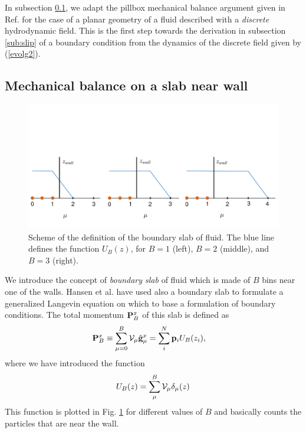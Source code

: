 \documentclass[b5paper,openright,10pt]{book}
\begin{document}
In subsection \ref{Sub:Mech}, we  adapt the pillbox mechanical balance
argument given in Ref.  \cite{CamargoBC2018} for  the case of a planar geometry of
a fluid  described with a \textit{discrete}  hydrodynamic field.  This
is the first step towards  the derivation in subsection \ref{sub:slip}
of a boundary condition from the  dynamics of the discrete field given
by (\ref{evolg2}).


\subsection{Mechanical balance on a slab near wall}
\label{Sub:Mech}

\begin{figure}[]
  \centering
  \includegraphics[width=\linewidth]{SchemeBSlab-3}
  \caption[Scheme of the definition of the boundary slab of fluid]{Scheme of the definition of the boundary slab of fluid. The blue line defines the function $U_{B}(z)$, for $B=1$ (left), $B=2$ (middle), and $B=3$ (right).}
\label{Fig.Slab}
\end{figure}

We introduce the  concept of \textit{boundary slab} of  fluid which is
made of $B$ bins near one of the walls. Hansen et al. \cite{Hansen2011}
have used  also a  boundary slab to  formulate a  generalized Langevin
equation on which  to base a formulation of  boundary conditions.  The
total momentum ${\bf P}_B^x$ of this slab is defined as
\begin{align}
{\bf P}_B^x&\equiv  \sum^{B}_{\mu=0}{\cal    V}_\mu    \hat{\bf    g}^x_\mu=\sum_i^N{\bf    p}_iU_B(z_i),
\end{align}
where we have introduced the function
\begin{align}
  U_B(z)=\sum_\mu^{B}{\cal    V}_{\mu}\delta_\mu(z)  
\end{align}
This function is plotted  in Fig. \ref{Fig.Slab} for different values of $B$ and
basically counts the particles that are near the wall.
\end{document}
